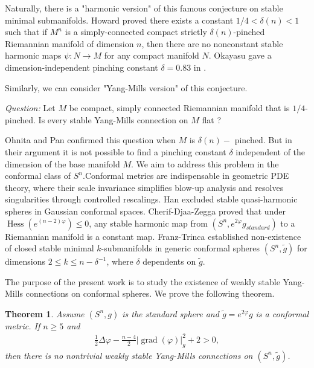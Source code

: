 \documentclass{amsart}
\newtheorem{theorem}{Theorem}[section]
\begin{document}
	Naturally, there is a "harmonic version" of this famous conjecture on stable minimal submanifolds. Howard \cite{H}  proved there exists a constant $1/4<\delta(n)<1$ such that if $M^n$ is a simply-connected compact strictly $\delta(n)$-pinched Riemannian manifold of dimension $n$, then there are no nonconstant stable harmonic maps $\psi: N\to M$ for any compact manifold $N$.  Okayasu gave a dimension-independent pinching constant $\delta=0.83$ in \cite{Ok}. 
	
	Similarly, we can consider "Yang-Mills version" of this conjecture.
	
	{\it Question:} Let $M$ be compact, simply connected Riemannian manifold that is $1/4$-pinched. Is every stable Yang-Mills connection on $M$  flat ?
	
	Ohnita and Pan \cite{OP} confirmed this question when $M$ is $\delta(n)-$ pinched. But in their argument it is not possible to find a pinching constant $\delta$  independent of the
	dimension of the base manifold $M$. We aim to address this problem in the conformal class of $S^n$.Conformal metrics are indispensable in geometric PDE theory, where their scale invariance simplifies blow-up analysis and resolves singularities through controlled rescalings. Han \cite{Han} excluded stable quasi-harmonic spheres in Gaussian conformal spaces. Cherif-Djaa-Zegga \cite{AMK} proved that under $\operatorname{Hess}(e^{(n-2)\varphi})\le0$, any stable harmonic map from $(S^n,e^{2\varphi}g_{standard})$ to a Riemannian manifold is a constant map. Franz-Trinca \cite{FT} established non-existence of closed stable minimal $k$-submanifolds in generic conformal spheres $(S^n,\tilde g)$ for dimensions $2\le k\le n-\delta^{-1}$, where $\delta$ dependents on $\tilde g$.
	
	The purpose of the present work is to study the existence of weakly stable Yang-Mills connections on conformal spheres. We prove the following theorem.
	\begin{theorem}\label{thm 1}
		Assume $(S^n,g)$ is the standard sphere and $\tilde g=e^{2\varphi}g$ is a conformal metric. If $n\ge5$ and
		\begin{align*}
			\frac12\Delta\varphi-\frac{n-4}2|\operatorname{grad}(\varphi)|_g^2+2>0,
		\end{align*}
		then there is no nontrivial weakly stable Yang-Mills connections on $(S^n,\tilde g)$.
	\end{theorem}
	
\end{document}
